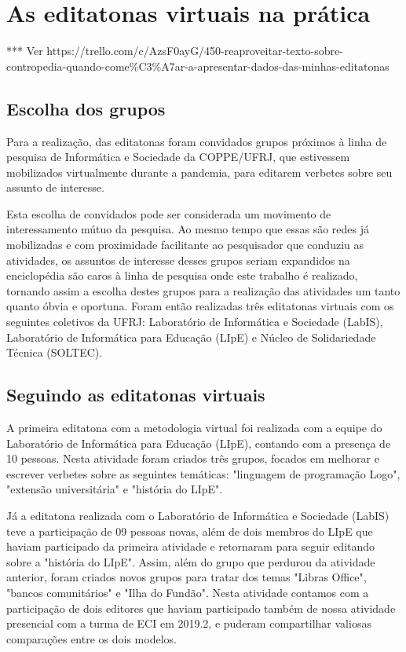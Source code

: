 
\section{As editatonas virtuais na prática}

*** Ver https://trello.com/c/AzsF0ayG/450-reaproveitar-texto-sobre-contropedia-quando-come\%C3\%A7ar-a-apresentar-dados-das-minhas-editatonas

\subsection{Escolha dos grupos}

Para a realização, das editatonas foram convidados grupos próximos à linha de pesquisa de Informática e Sociedade da COPPE/UFRJ, que estivessem mobilizados virtualmente durante a pandemia, para editarem verbetes sobre seu assunto de interesse.

Esta escolha de convidados pode ser considerada um movimento de interessamento mútuo da pesquisa. Ao mesmo tempo que essas são redes já mobilizadas e com proximidade facilitante ao pesquisador que conduziu as atividades, os assuntos de interesse desses grupos seriam expandidos na enciclopédia são caros à linha de pesquisa onde este trabalho é realizado, tornando assim a escolha destes grupos para a realização das atividades um tanto quanto óbvia e oportuna.
 Foram então realizadas três editatonas virtuais com os seguintes coletivos da UFRJ: Laboratório de Informática e Sociedade (LabIS), Laboratório de Informática para Educação (LIpE) e Núcleo de Solidariedade Técnica (SOLTEC).
 
\subsection{Seguindo as editatonas virtuais}

A primeira editatona com a metodologia virtual foi realizada com a equipe do Laboratório de Informática para Educação (LIpE), contando com a presença de 10 pessoas. Nesta atividade foram criados três grupos, focados em melhorar e escrever verbetes sobre as seguintes temáticas: "linguagem de programação Logo", "extensão universitária" e "história do LIpE".

Já a editatona realizada com o Laboratório de Informática e Sociedade (LabIS) teve a participação de 09 pessoas novas, além de dois membros do LIpE que haviam participado da primeira atividade e retornaram para seguir editando sobre a "história do LIpE". Assim, além do grupo que perdurou da atividade anterior, foram criados novos grupos para tratar dos temas "Libras Office", "bancos comunitários" e "Ilha do Fundão". Nesta atividade contamos com a participação de dois editores que haviam participado também de nossa atividade presencial com a turma de ECI em 2019.2, e puderam compartilhar valiosas comparações entre os dois modelos.

